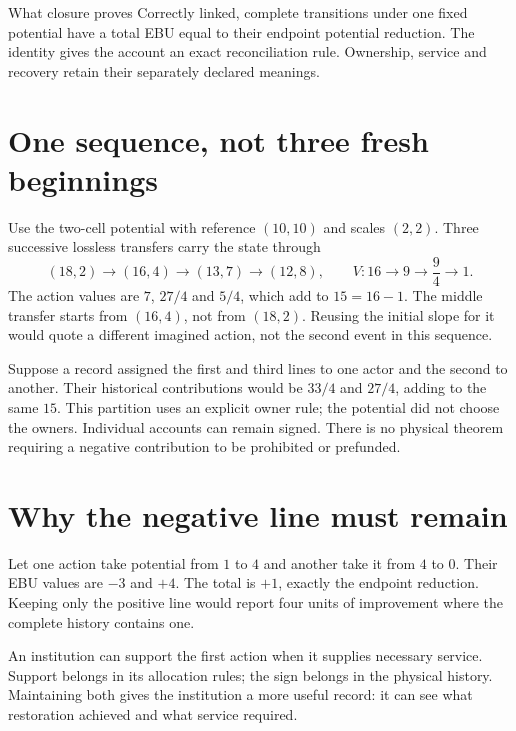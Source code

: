 \begin{lawbox}{What closure proves}
Correctly linked, complete transitions under one fixed potential have a
total EBU equal to their endpoint potential reduction. The identity gives the account an exact reconciliation rule. Ownership, service and recovery retain their separately declared meanings.
\end{lawbox}

\section{One sequence, not three fresh beginnings}
Use the two-cell potential with reference $(10,10)$ and scales $(2,2)$.
Three successive lossless transfers carry the state through
\[
 (18,2)\to(16,4)\to(13,7)\to(12,8),
 \qquad V:16\to9\to\frac94\to1.
\]
The action values are $7$, $27/4$ and $5/4$, which add to $15=16-1$.
The middle transfer starts from $(16,4)$, not from $(18,2)$. Reusing the
initial slope for it would quote a different imagined action, not the
second event in this sequence.


Suppose a record assigned the first and third lines to one actor and the
second to another. Their historical contributions would be $33/4$ and
$27/4$, adding to the same $15$. This partition uses an explicit owner rule;
the potential did not choose the owners. Individual accounts can remain
signed. There is no physical theorem requiring a negative contribution to
be prohibited or prefunded.

\section{Why the negative line must remain}
Let one action take potential from $1$ to $4$ and another take it from $4$ to $0$. Their EBU values are $-3$ and $+4$. The total is $+1$, exactly the endpoint reduction. Keeping only the positive line would report four units of improvement where the complete history contains one.

An institution can support the first action when it supplies necessary service. Support belongs in its allocation rules; the sign belongs in the physical history. Maintaining both gives the institution a more useful record: it can see what restoration achieved and what service required.

